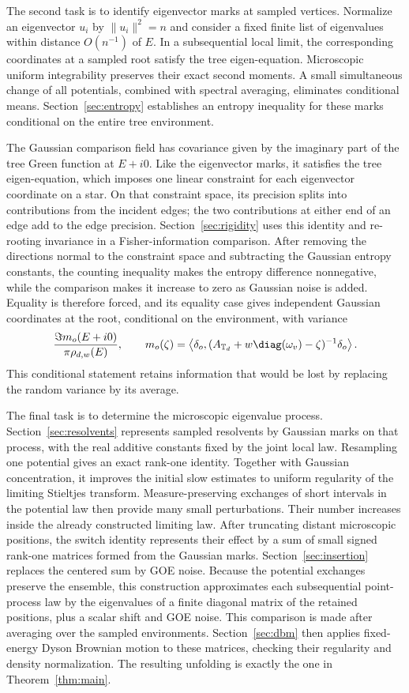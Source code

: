 The second task is to identify eigenvector marks at sampled vertices.
Normalize an eigenvector $u_i$ by $\|u_i\|^2=n$ and consider a fixed
finite list of eigenvalues within distance $O(n^{-1})$ of $E$.
In a subsequential local limit, the corresponding coordinates at a
sampled root satisfy the tree eigen-equation.  Microscopic uniform
integrability preserves their exact second moments.  A small simultaneous
change of all potentials, combined with spectral averaging, eliminates
conditional means.  Section~\ref{sec:entropy} establishes an entropy
inequality for these marks conditional on the entire tree environment.

The Gaussian comparison field has covariance given by the imaginary part
of the tree Green function at $E+i0$.  Like the eigenvector marks, it
satisfies the tree eigen-equation, which imposes one linear constraint
for each eigenvector coordinate on a star.  On that constraint space,
its precision splits into contributions
from the incident edges; the two contributions at either end of an edge
add to the edge precision.  Section~\ref{sec:rigidity} uses this identity
and re-rooting invariance in a Fisher-information comparison.  After
removing the directions normal to the constraint space and subtracting
the Gaussian entropy constants, the counting inequality makes the
entropy difference
nonnegative, while the comparison makes it increase to zero as Gaussian
noise is added.  Equality is therefore forced, and its equality case gives
independent Gaussian coordinates at the root, conditional on the
environment, with variance
\[
 \frac{\Im m_o(E+i0)}{\pi\rho_{d,w}(E)},
 \qquad
 m_o(\zeta)=\left\langle\delta_o,
 (A_{\mathbb T_d}+w\diag(\omega_v)-\zeta)^{-1}\delta_o\right\rangle.
\]
This conditional statement retains information that would be lost by
replacing the random variance by its average.

The final task is to determine the microscopic eigenvalue process.
Section~\ref{sec:resolvents} represents sampled resolvents by Gaussian
marks on that process, with the real additive constants fixed by the
joint local law.  Resampling one potential gives an exact rank-one
identity.  Together with Gaussian concentration, it improves the initial
slow estimates to uniform regularity of the limiting Stieltjes transform.
Measure-preserving exchanges of short intervals in the potential law
then provide many small perturbations.  Their number increases inside the
already constructed limiting law.  After truncating distant microscopic
positions, the switch identity represents their effect by a sum of small
signed rank-one matrices formed from the Gaussian marks.
Section~\ref{sec:insertion} replaces the centered sum by GOE noise.
Because the potential exchanges preserve the ensemble, this construction
approximates each subsequential point-process law by the eigenvalues of a
finite diagonal matrix of the retained positions, plus a scalar shift and
GOE noise.  This comparison is made after averaging over the sampled
environments.  Section~\ref{sec:dbm} then applies fixed-energy Dyson
Brownian motion to these matrices, checking their regularity and density
normalization.  The resulting unfolding is exactly the one in
Theorem~\ref{thm:main}.

